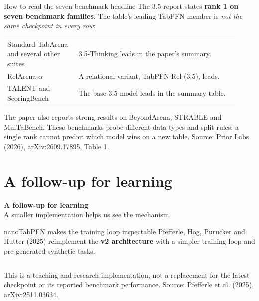 \documentclass[aspectratio=169]{beamer}
\begin{document}
\begin{frame}{How to read the seven-benchmark headline}
  \small
  The 3.5 report states \textbf{rank 1 on seven benchmark families}. The table's
  leading TabPFN member is \emph{not the same checkpoint in every row}:
  \vskip 8pt
  \begin{tabular}{L{0.29\linewidth}L{0.63\linewidth}}
    Standard TabArena and several other suites & 3.5-Thinking leads in the paper's summary.\\[5pt]
    RelArena-$\alpha$ & A relational variant, TabPFN-Rel (3.5), leads.\\[5pt]
    TALENT and ScoringBench & The base 3.5 model leads in the summary table.
  \end{tabular}
  \vskip 11pt
  The paper also reports strong results on BeyondArena, STRABLE and MulTaBench.
  These benchmarks probe different data types and split rules; a single rank cannot
  predict which model wins on a new table.
  \vskip 4pt
  {\scriptsize Source: Prior Labs (2026), arXiv:2609.17895, Table 1.}
\end{frame}

\section{A follow-up for learning}
\begin{frame}[plain]
  \vfill\centering
  {\Large\color{popblue}\textbf{A follow-up for learning}}\\[9pt]
  {\small A smaller implementation helps us see the mechanism.}
  \vfill
\end{frame}

\begin{frame}{nanoTabPFN makes the training loop inspectable}
  \small
  Pfefferle, Hog, Purucker and Hutter (2025) reimplement the \textbf{v2 architecture}
  with a simpler training loop and pre-generated synthetic tasks.
  \vskip 10pt
  \begin{columns}[T]
  \end{columns}
  \vskip 10pt
  This is a teaching and research implementation, not a replacement for the
  latest checkpoint or its reported benchmark performance.
  \vskip 4pt
  {\scriptsize Source: Pfefferle et al. (2025), arXiv:2511.03634.}
\end{frame}
\end{document}
